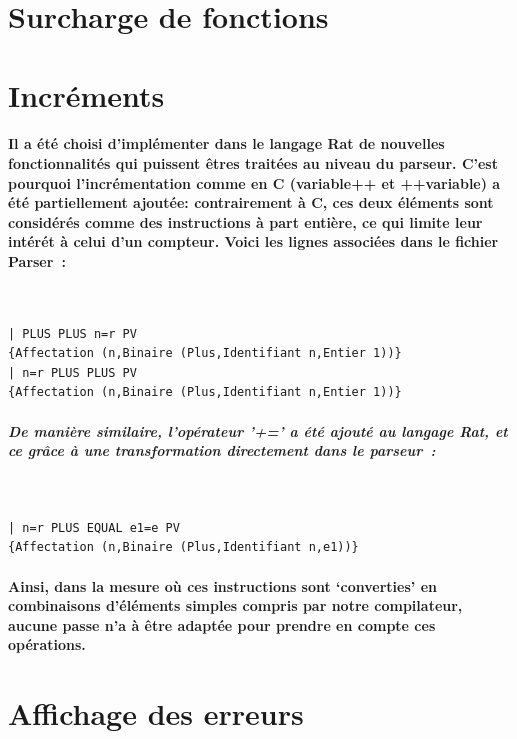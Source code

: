 \documentclass[french]{article}
\begin{document}
\section{Surcharge de fonctions}

\section{Incréments}
\paragraph*{Il a été choisi d'implémenter dans le langage Rat de nouvelles fonctionnalités qui puissent êtres traitées au niveau du parseur. C'est pourquoi
l'incrémentation comme en C (variable++ et ++variable) a été partiellement ajoutée: contrairement à C, ces deux éléments sont considérés comme
des instructions à part entière, ce qui limite leur intérét à celui d'un compteur. Voici les lignes associées dans le fichier Parser~:}
\,
\begin{lstlisting}
| PLUS PLUS n=r PV 
{Affectation (n,Binaire (Plus,Identifiant n,Entier 1))}
| n=r PLUS PLUS PV 
{Affectation (n,Binaire (Plus,Identifiant n,Entier 1))}
\end{lstlisting}

\subparagraph*{De manière similaire, l'opérateur '+=' a été ajouté au langage Rat, et ce grâce à une transformation directement dans le parseur~:}
\,
\begin{lstlisting}
| n=r PLUS EQUAL e1=e PV 
{Affectation (n,Binaire (Plus,Identifiant n,e1))}
\end{lstlisting}

\paragraph*{Ainsi, dans la mesure où ces instructions sont `converties' en combinaisons d'éléments simples compris par notre compilateur, aucune passe n'a
à être adaptée pour prendre en compte ces opérations.}

\section{Affichage des erreurs}
\end{document}

